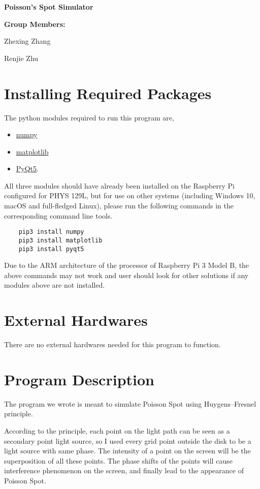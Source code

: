 \documentclass[12pt]{article}
\begin{document}
\begin{center}
    \textbf{\Large Poisson's Spot Simulator}
\end{center}

\textbf{Group Members:}

\qquad Zhexing Zhang

\qquad Renjie Zhu

\section{Installing Required Packages}

The python modules required to run this program are,
\begin{itemize}
    \item \href{http://www.numpy.org/}{numpy}
    \item \href{https://matplotlib.org/}{matplotlib}
    \item \href{https://pypi.org/project/PyQt5/}{PyQt5}.
\end{itemize}

All three modules should have already been installed on the 
Raspberry Pi configured for PHYS 129L, but for use on 
other systems (including Windows 10, macOS and full-fledged
Linux), please run the following commands in the corresponding
command line tools.

{\selectfont 
\begin{lstlisting}
    pip3 install numpy
    pip3 install matplotlib
    pip3 install pyqt5
\end{lstlisting}
}

Due to the ARM architecture of the processor of Raspberry 
Pi 3 Model B, the above commands may not work and user 
should look for other solutions if any modules above are 
not installed. 

\section{External Hardwares}

There are no external hardwares needed for this program to
function.

\section{Program Description}

The program we wrote is meant to simulate Poisson Spot using Huygens–Fresnel principle. 

According to the principle, each point on the light path can be seen as a secondary point light source, so I used every grid point outside the disk to be a light source with same phase. The intensity of a point on the screen will be the superposition of all these points. The phase shifts of the points will cause interference phenomenon on the screen, and finally lead to the appearance of Poisson Spot.
\end{document}
